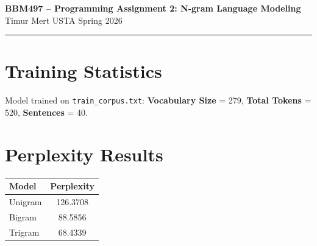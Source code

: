 \documentclass[a4paper,10pt]{article}
\begin{document}
\begin{center}
{\large\bfseries BBM497 -- Programming Assignment 2: N-gram Language Modeling}\\[2pt]
Timur Mert USTA \hfill Spring 2026
\end{center}
\vspace{-4pt}
\hrule
\vspace{4pt}

\section{Training Statistics}
Model trained on \texttt{train\_corpus.txt}: \textbf{Vocabulary Size} = 279, \textbf{Total Tokens} = 520, \textbf{Sentences} = 40.

\section{Perplexity Results}
\vspace{-2pt}
\begin{center}\small
\begin{tabular}{lc}
\toprule
\textbf{Model} & \textbf{Perplexity} \\
\midrule
Unigram & 126.3708 \\
Bigram  & 88.5856  \\
Trigram & 68.4339  \\
\bottomrule
\end{tabular}
\end{center}
\vspace{-4pt}
\end{document}
